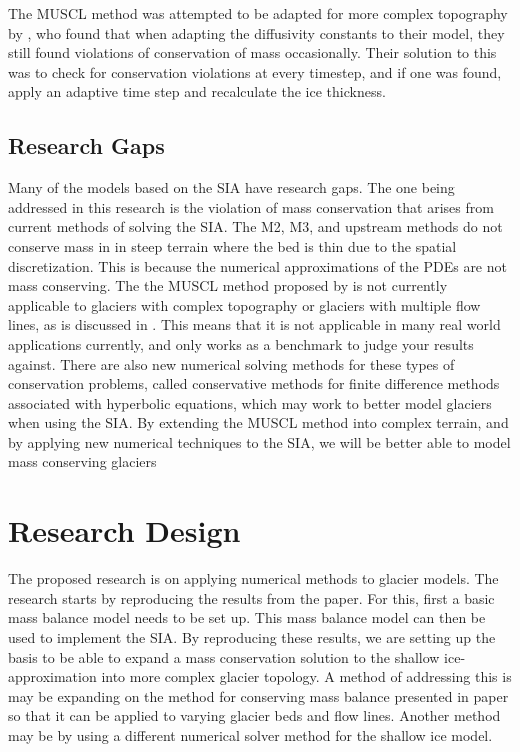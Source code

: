 \documentclass{article}
\begin{document}
The MUSCL method was attempted to be adapted for more complex topography by \citet{Clarke2015}, who found that when adapting the diffusivity constants to their model, they still found violations of conservation of mass occasionally. Their solution to this was to check for conservation violations at every timestep, and if one was found, apply an adaptive time step and recalculate the ice thickness. 

\subsection{Research Gaps}
Many of the models based on the SIA have research gaps. The one being addressed in this research is the violation of mass conservation that arises from current methods of solving the SIA. The M2, M3, and upstream methods do not conserve mass in in steep terrain where the bed is thin due to the spatial discretization. This is because the numerical approximations of the PDEs are not mass conserving. The the MUSCL method proposed by \citet{Jarosch2013} is not currently applicable to glaciers with complex topography or glaciers with multiple flow lines, as is discussed in \citet{Maussion2019}. This means that it is not applicable in many real world applications currently, and only works as a benchmark to judge your results against. There are also new numerical solving methods for these types of conservation problems, called conservative methods for finite difference methods associated with hyperbolic equations, which may work to better model glaciers when using the SIA. By extending the MUSCL method into complex terrain, and by applying new numerical techniques to the SIA, we will be better able to model mass conserving glaciers


\section{Research Design}

The proposed research is on applying numerical methods to glacier models. The research starts by reproducing the results from the \citet{Jarosch2013} paper. For this, first a basic mass balance model needs to be set up. This mass balance model can then be used to implement the SIA. By reproducing these results, we are setting up the basis to be able to expand a mass conservation solution to the shallow ice-approximation into more complex glacier topology. A method of addressing this is may be expanding on the method for conserving mass balance presented in \citet{Jarosch2013} paper so that it can be applied to varying glacier beds and flow lines. Another method may be by using a different numerical solver method for the shallow ice model.
\end{document}
